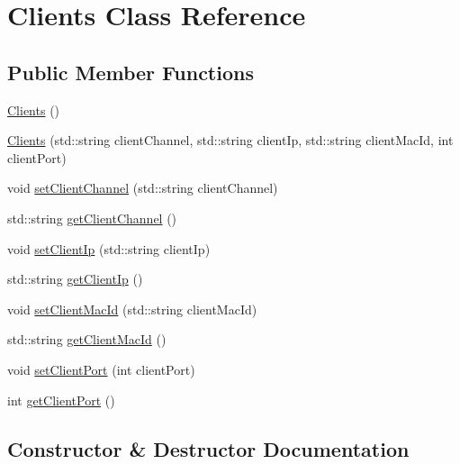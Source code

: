 \hypertarget{class_clients}{}\section{Clients Class Reference}
\label{class_clients}
\subsection*{Public Member Functions}
\begin{DoxyCompactItemize}
\item 
\mbox{\hyperlink{class_clients_a52adec0cc4a88e46cf780c13f0bd9d5c}{Clients}} ()
\item 
\mbox{\hyperlink{class_clients_ac1a2d994c59f8ce19e047d8d16f66056}{Clients}} (std\+::string client\+Channel, std\+::string client\+Ip, std\+::string client\+Mac\+Id, int client\+Port)
\item 
void \mbox{\hyperlink{class_clients_a0137730d1ce598d40b185ad666d103b3}{set\+Client\+Channel}} (std\+::string client\+Channel)
\item 
std\+::string \mbox{\hyperlink{class_clients_ad8b872bcb7226ead7c33a77629faba75}{get\+Client\+Channel}} ()
\item 
void \mbox{\hyperlink{class_clients_ac43dfa53c63987a37c9b92b1535843d6}{set\+Client\+Ip}} (std\+::string client\+Ip)
\item 
std\+::string \mbox{\hyperlink{class_clients_ab18c2d6ccb3a0779abf0949d2f6d9747}{get\+Client\+Ip}} ()
\item 
void \mbox{\hyperlink{class_clients_a56877afde8405ca1de35e20d1eed2fc1}{set\+Client\+Mac\+Id}} (std\+::string client\+Mac\+Id)
\item 
std\+::string \mbox{\hyperlink{class_clients_ae00e652fbc85d9f2fbbf84a2c79385f7}{get\+Client\+Mac\+Id}} ()
\item 
void \mbox{\hyperlink{class_clients_a4f4a445570f1712dc275c1897794d8a6}{set\+Client\+Port}} (int client\+Port)
\item 
int \mbox{\hyperlink{class_clients_a96ae9e59ebdb0f56a933a1d1f4cfc080}{get\+Client\+Port}} ()
\end{DoxyCompactItemize}


\subsection{Constructor \& Destructor Documentation}
\mbox{\label{class_clients_a52adec0cc4a88e46cf780c13f0bd9d5c}} 
